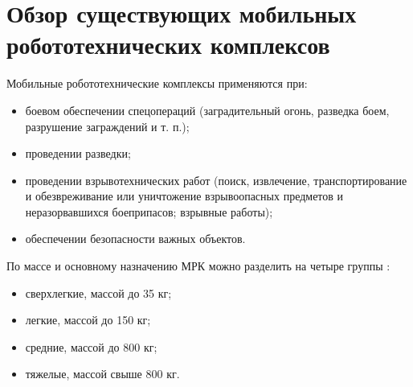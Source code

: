 \section{Обзор существующих мобильных робототехнических комплексов}
Мобильные робототехнические комплексы применяются при:
\begin{itemize}
\item боевом обеспечении спецопераций (заградительный огонь, разведка боем, разрушение заграждений и т. п.);
\item проведении разведки;
\item проведении взрывотехнических работ (поиск, извлечение, транспортирование и обезвреживание или уничтожение взрывоопасных предметов и неразорвавшихся боеприпасов; взрывные работы);
\item обеспечении безопасности важных объектов.
\end{itemize}

По массе и основному назначению МРК можно разделить на четыре группы :
\begin{itemize}
\item сверхлегкие, массой до 35 кг;
\item легкие, массой до 150 кг;
\item средние, массой до 800 кг;
\item тяжелые, массой свыше 800 кг.
\end{itemize}

